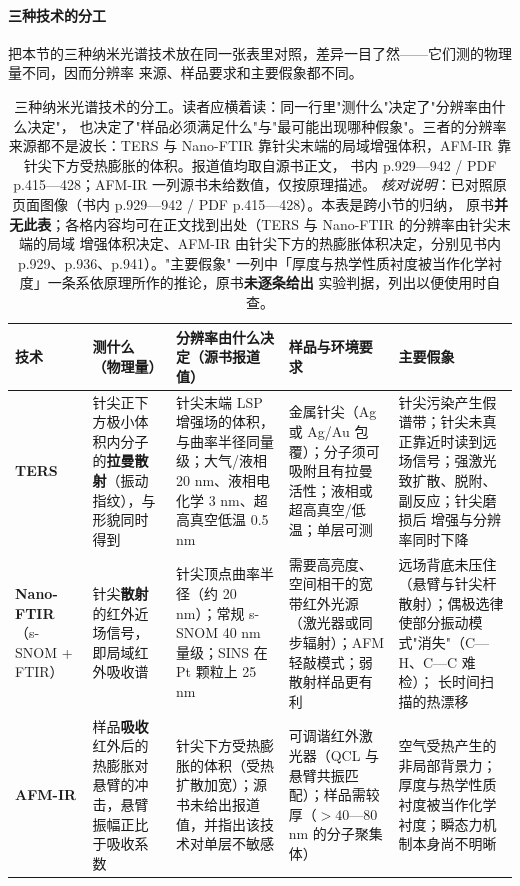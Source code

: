 \paragraph{三种技术的分工}
把本节的三种纳米光谱技术放在同一张表里对照，差异一目了然——它们测的物理量不同，因而分辨率
来源、样品要求和主要假象都不同。

\begin{table}[htbp]
\centering
{\srcsize
\setlength{\tabcolsep}{4pt}
\begin{tabularx}{\textwidth}{@{}p{15mm}XXXX@{}}
\toprule
技术 & 测什么（物理量） & 分辨率由什么决定（源书报道值） & 样品与环境要求 & 主要假象 \\
\midrule
\textbf{TERS} &
针尖正下方极小体积内分子的\textbf{拉曼散射}（振动指纹），与形貌同时得到 &
针尖末端 LSP 增强场的体积，与曲率半径同量级；大气/液相 20 nm、液相电化学 3 nm、超高真空低温 0.5 nm &
金属针尖（Ag 或 Ag/Au 包覆）；分子须可吸附且有拉曼活性；液相或超高真空/低温；单层可测 &
针尖污染产生假谱带；针尖未真正靠近时读到远场信号；强激光致扩散、脱附、副反应；针尖磨损后
增强与分辨率同时下降 \\
\textbf{Nano-FTIR}（s-SNOM + FTIR） &
针尖\textbf{散射}的红外近场信号，即局域红外吸收谱 &
针尖顶点曲率半径（约 20 nm）；常规 s-SNOM 40 nm 量级；SINS 在 Pt 颗粒上 25 nm &
需要高亮度、空间相干的宽带红外光源（激光器或同步辐射）；AFM 轻敲模式；弱散射样品更有利 &
远场背底未压住（悬臂与针尖杆散射）；偶极选律使部分振动模式"消失"（C—H、C—C 难检）；
长时间扫描的热漂移 \\
\textbf{AFM-IR} &
样品\textbf{吸收}红外后的热膨胀对悬臂的冲击，悬臂振幅正比于吸收系数 &
针尖下方受热膨胀的体积（受热扩散加宽）；源书未给出报道值，并指出该技术对单层不敏感 &
可调谐红外激光器（QCL 与悬臂共振匹配）；样品需较厚（$>40$—80 nm 的分子聚集体） &
空气受热产生的非局部背景力；厚度与热学性质衬度被当作化学衬度；瞬态力机制本身尚不明晰 \\
\bottomrule
\end{tabularx}
}
\caption{三种纳米光谱技术的分工。读者应横着读：同一行里"测什么"决定了"分辨率由什么决定"，
也决定了"样品必须满足什么"与"最可能出现哪种假象"。三者的分辨率来源都不是波长：TERS 与
Nano-FTIR 靠针尖末端的局域增强体积，AFM-IR 靠针尖下方受热膨胀的体积。报道值均取自源书正文，
书内 p.929—942 / PDF p.415—428；AFM-IR 一列源书未给数值，仅按原理描述。
\emph{核对说明}：已对照原页面图像（书内 p.929—942 / PDF p.415—428）。本表是跨小节的归纳，
原书\textbf{并无此表}；各格内容均可在正文找到出处（TERS 与 Nano-FTIR 的分辨率由针尖末端的局域
增强体积决定、AFM-IR 由针尖下方的热膨胀体积决定，分别见书内 p.929、p.936、p.941）。"主要假象"
一列中「厚度与热学性质衬度被当作化学衬度」一条系依原理所作的推论，原书\textbf{未逐条给出}
实验判据，列出以便使用时自查。}
\label{tab:nano-three}
\end{table}


